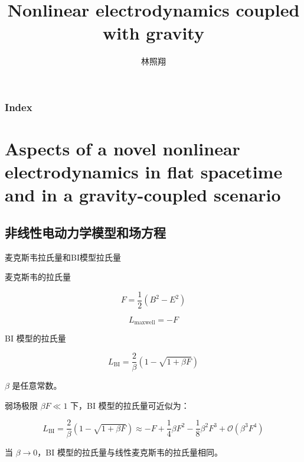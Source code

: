 \documentclass[9pt, dvipsnames]{beamer} %
\title{Nonlinear electrodynamics coupled with gravity } %
\author[林照翔]{林照翔} %
\date{} %
\begin{document}
\everymath{\displaystyle}

\begin{frame}
    \titlepage %
\end{frame}

\begin{frame}
    \frametitle{\textbf{Index}}
    \begin{multicols}{2}
    \tableofcontents
    \end{multicols}
\end{frame}



\section{Aspects of a novel nonlinear electrodynamics in flat spacetime and in a gravity-coupled scenario}



\subsection{非线性电动力学模型和场方程}



\begin{frame}{麦克斯韦拉氏量和BI模型拉氏量}

麦克斯韦的拉氏量

$$
F
=\frac{1 }{2 } (B^2-E^2)
$$

$$
L_{\mathrm{maxwell}}
=-F
$$

BI 模型的拉氏量

$$
L_{\mathrm{BI}}
=\frac{2 }{\beta } \left(1-\sqrt{1+\beta F} \right) 
$$

$\beta $ 是任意常数。

弱场极限 $\beta F\ll 1 $ 下，BI 模型的拉氏量可近似为：

$$
L_{\mathrm{BI}}
=\frac{2 }{\beta } \left(1-\sqrt{1+\beta F} \right)
\approx -F + \frac{1 }{4 } \beta F^2 - \frac{1 }{8 } \beta^2 F^3 +\mathcal{O}\left(\beta^3 F^4 \right) 
$$

当 $\beta\to 0 $，BI 模型的拉氏量与线性麦克斯韦的拉氏量相同。

\end{frame}
\end{document}
